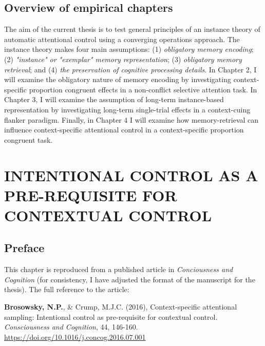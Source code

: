 \documentclass[]{DissertateCUNY}
\begin{document}
\hypertarget{overview-of-empirical-chapters}{%
\section{Overview of empirical
chapters}\label{overview-of-empirical-chapters}}

The aim of the current thesis is to test general principles of an
instance theory of automatic attentional control using a converging
operations approach. The instance theory makes four main assumptions:
(1) \textit{obligatory memory encoding}; (2)
\textit{"instance" or "exemplar" memory representation}; (3)
\textit{obligatory memory retrieval}; and (4)
\textit{the preservation of cognitive processing details}. In Chapter 2,
I will examine the obligatory nature of memory encoding by investigating
context-specific proportion congruent effects in a non-conflict
selective attention task. In Chapter 3, I will examine the assumption of
long-term instance-based representation by investigating long-term
single-trial effects in a context-cuing flanker paradigm. Finally, in
Chapter 4 I will examine how memory-retrieval can influence
context-specific attentional control in a context-specific proportion
congruent task.

\FloatBarrier

\newpage
{}
\fancyhead[R]{\thepage}
\fancyfoot[C]{}

\chapter{INTENTIONAL CONTROL AS A PRE-REQUISITE FOR CONTEXTUAL CONTROL}

\hypertarget{preface}{%
\section{Preface}\label{preface}}

This chapter is reproduced from a published article in
\textit{Conciousness and Cognition} (for consistency, I have adjusted
the format of the manuscript for the thesis). The full reference to the
article:

\vspace{1.5em}

\noindent \textbf{Brosowsky, N.P.}, \& Crump, M.J.C. (2016),
Context-specific attentional sampling: Intentional control as
pre-requisite for contextual control.
\textit{Consciousness and Cognition}, 44, 146-160.
\url{https://doi.org/10.1016/j.concog.2016.07.001} \vspace{1.5em}
\end{document}
